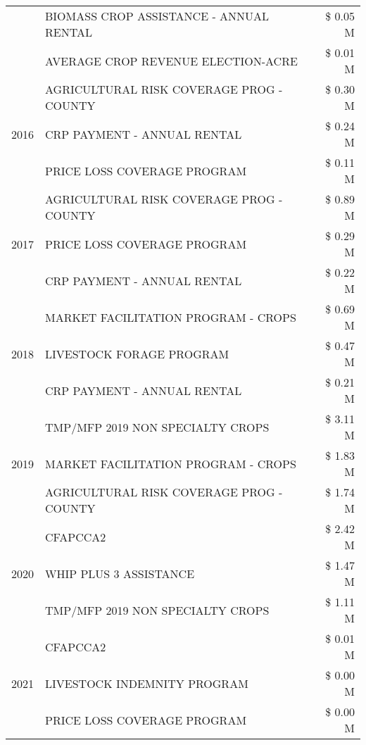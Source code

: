 \begin{tabular}{llr}
 & BIOMASS CROP ASSISTANCE - ANNUAL RENTAL & \$ 0.05 M \\
 & AVERAGE CROP REVENUE ELECTION-ACRE & \$ 0.01 M \\
\cline{1-3}
\multirow[t]{3}{*}{2016} & AGRICULTURAL RISK COVERAGE PROG - COUNTY & \$ 0.30 M \\
 & CRP PAYMENT - ANNUAL RENTAL & \$ 0.24 M \\
 & PRICE LOSS COVERAGE PROGRAM & \$ 0.11 M \\
\cline{1-3}
\multirow[t]{3}{*}{2017} & AGRICULTURAL RISK COVERAGE PROG - COUNTY & \$ 0.89 M \\
 & PRICE LOSS COVERAGE PROGRAM & \$ 0.29 M \\
 & CRP PAYMENT - ANNUAL RENTAL & \$ 0.22 M \\
\cline{1-3}
\multirow[t]{3}{*}{2018} & MARKET FACILITATION PROGRAM - CROPS & \$ 0.69 M \\
 & LIVESTOCK FORAGE PROGRAM & \$ 0.47 M \\
 & CRP PAYMENT - ANNUAL RENTAL & \$ 0.21 M \\
\cline{1-3}
\multirow[t]{3}{*}{2019} & TMP/MFP 2019 NON SPECIALTY CROPS & \$ 3.11 M \\
 & MARKET FACILITATION PROGRAM - CROPS & \$ 1.83 M \\
 & AGRICULTURAL RISK COVERAGE PROG - COUNTY & \$ 1.74 M \\
\cline{1-3}
\multirow[t]{3}{*}{2020} & CFAPCCA2 & \$ 2.42 M \\
 & WHIP PLUS 3 ASSISTANCE & \$ 1.47 M \\
 & TMP/MFP 2019 NON SPECIALTY CROPS & \$ 1.11 M \\
\cline{1-3}
\multirow[t]{3}{*}{2021} & CFAPCCA2 & \$ 0.01 M \\
 & LIVESTOCK INDEMNITY PROGRAM & \$ 0.00 M \\
 & PRICE LOSS COVERAGE PROGRAM & \$ 0.00 M \\
\cline{1-3}
\bottomrule
\end{tabular}
